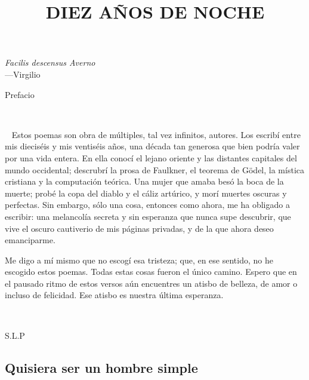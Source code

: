 \documentclass[a4paper, 12pt]{article}
\title{DIEZ AÑOS DE NOCHE}
\begin{document}
\date{}
\maketitle

\pagebreak

\hspace*{\fill}\textit{Facilis descensus Averno}\\
\hspace*{\fill}—Virgilio

\pagebreak
\tableofcontents
\pagebreak
\Huge
\centerline{Prefacio}
\normalsize

~

~ Estos poemas son obra de múltiples, tal vez infinitos, autores. Los escribí
entre mis dieciséis y mis ventiséis años, una década tan generosa que bien
podría valer por una vida entera. En ella conocí el lejano oriente y las
distantes capitales del mundo occidental; descrubrí la prosa de Faulkner, el
teorema de Gödel, la mística cristiana y la computación teórica. Una mujer que
amaba besó la boca de la muerte; probé la copa del diablo y el cáliz artúrico, y
morí muertes oscuras y perfectas. Sin embargo, sólo una cosa, entonces como
ahora, me ha obligado a escribir: una melancolía secreta y sin esperanza que
nunca supe descubrir, que vive el oscuro cautiverio de mis páginas privadas, y
de la que ahora deseo emanciparme.

Me digo a mí mismo que no escogí esa tristeza; que, en ese sentido, no he
escogido estos poemas. Todas estas cosas fueron el único camino. Espero que en
el pausado ritmo de estos versos aún encuentres un atisbo de belleza, de amor o
incluso de felicidad. Ese atisbo es nuestra última esperanza.


~

\hspace*{\fill}S.L.P
~

\pagebreak

\subsection{Quisiera ser un hombre simple}
~
\end{document}
